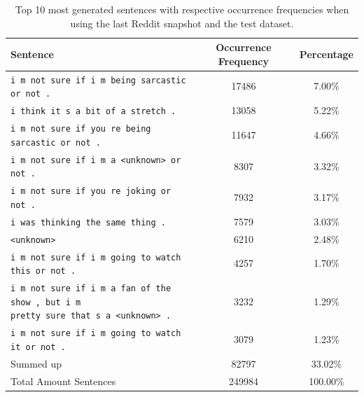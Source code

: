 \begin{table}[H]
	\centering
	\begin{adjustbox}{max width=\textwidth}
		\begin{tabular}{lcc}
			\toprule
			Sentence & Occurrence Frequency & Percentage\\ \midrule
			\texttt{i m not sure if i m being sarcastic or not .} & 17486 & 7.00\%\\
			\texttt{i think it s a bit of a stretch .} & 13058 & 5.22\%\\
			\texttt{i m not sure if you re being sarcastic or not .} & 11647 & 4.66\%\\
			\texttt{i m not sure if i m a <unknown> or not .} & 8307 & 3.32\%\\
			\texttt{i m not sure if you re joking or not .} & 7932 & 3.17\%\\
			\texttt{i was thinking the same thing .} & 7579 & 3.03\%\\
			\texttt{<unknown>} & 6210 & 2.48\%\\
			\texttt{i m not sure if i m going to watch this or not .} & 4257 & 1.70\%\\
			\specialcell{\texttt{i m not sure if i m a fan of the show , but i m}\\\texttt{pretty sure that s a <unknown> .}} & 3232 & 1.29\%\\
			\texttt{i m not sure if i m going to watch it or not .} & 3079 & 1.23\%\\
			\midrule
			Summed up & 82797 & 33.02\%\\
			\midrule
			\midrule
			Total Amount Sentences & 249984 & 100.00\%\\
			\bottomrule
		\end{tabular}
	\end{adjustbox}
	\caption{Top 10 most generated sentences with respective occurrence frequencies when using the last Reddit snapshot and the test dataset.}
	\label{results:test_performance:reddit_sample_outputs}
\end{table}

